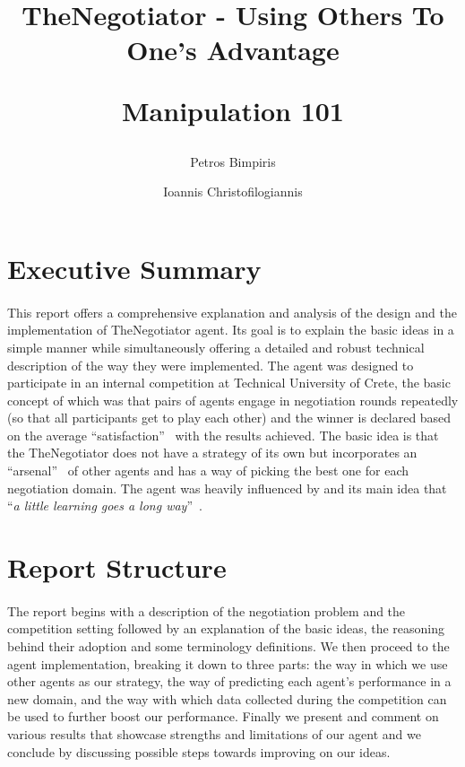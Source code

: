 \documentclass[12pt]{article}
\author{%
	Petros Bimpiris
	\and
	Ioannis Christofilogiannis
}
\date{
	\begin{center}
	\hspace{2.5cm}Technical University of Crete
	\newline
	\phantom{-----------------}Multiagent Systems (COMP512)		%
	\newline
	February 2024 
	\end{center}
	\vspace{-0.5cm}
}
\title{
	\vspace{-2cm}
	\textbf{TheNegotiator - Using Others To One's Advantage}

	Manipulation 101
}
\numberwithin{equation}{section}
\newcommand{\quotes}[1]{\textquotedblleft #1\textquotedblright \ }
\begin{document}
 

	\maketitle

	\section*{Executive Summary}	\label{sec:execuctive_summary}		%

		\paragraph*{}
			This report offers a comprehensive explanation and analysis of the design and the implementation of TheNegotiator agent. Its goal is to explain the basic ideas in a simple manner while simultaneously offering a detailed and robust technical description of the way they were implemented.
			The agent was designed to participate in an internal competition at Technical University of Crete, the basic concept of which was that pairs of agents engage in negotiation rounds repeatedly (so that all participants get to play each other) and the winner is declared based on the average \quotes{satisfaction} with the results achieved.
			The basic idea is that the TheNegotiator does not have a strategy of its own but incorporates an \quotes{arsenal} of other agents and has a way of picking the best one for each negotiation domain. The agent was heavily influenced by \cite{meta_agent_paper} and its main idea that \quotes{\emph{a little learning goes a long way}}.	%


	\section*{Report Structure}	\label{sec:report_structure}		%

		\paragraph*{}
			The report begins with a description of the negotiation problem and the competition setting followed by an explanation of the basic ideas, the reasoning behind their adoption and some terminology definitions.
			We then proceed to the agent implementation, breaking it down to three parts: the way in which we use other agents as our strategy, the way of predicting each agent's performance in a new domain, and the way with which data collected during the competition can be used to further boost our performance. Finally we present and comment on various results that showcase strengths and limitations of our agent and we conclude by discussing possible steps towards improving on our ideas.
			\hfill
\end{document}
